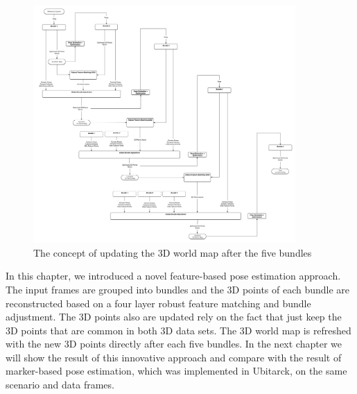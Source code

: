\begin{figure}[H]
  \centering
  \includegraphics[width=100mm]{figures/mapping}
  \caption{The concept of updating the 3D world map after the five bundles}\label{fig:mapping_concept}
\end{figure}

In this chapter, we introduced a novel feature-based pose estimation approach. The input frames are grouped into bundles and the 3D points of each bundle are reconstructed based on a four layer robust feature matching and bundle adjustment. The 3D points also are updated rely on the fact that just keep the 3D points that are common in both 3D data sets. The 3D world map is refreshed with the new 3D points directly after each five bundles. In the next chapter we will show the result of this innovative approach and compare with the result of marker-based pose estimation, which was implemented in Ubitarck, on the same scenario and data frames.
